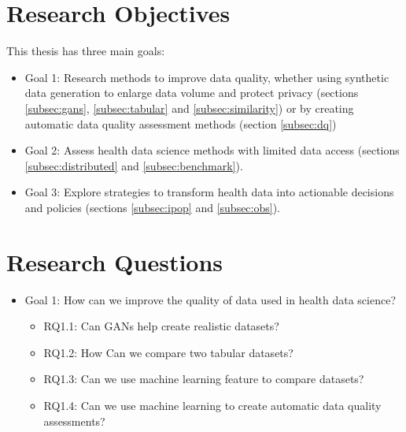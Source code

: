 
\section{Research Objectives}
This thesis has three main goals:


\begin{itemize}
    \item Goal 1: Research methods to improve data quality, whether using synthetic data generation to enlarge data volume and protect privacy (sections \ref{subsec:gans}, \ref{subsec:tabular} and \ref{subsec:similarity}) or by creating automatic data quality assessment methods (section \ref{subsec:dq})

    \item Goal 2: Assess health data science  methods with limited data access (sections \ref{subsec:distributed} and \ref{subsec:benchmark}).

    \item Goal 3: Explore strategies to transform health data into actionable decisions and policies (sections  \ref{subsec:ipop} and \ref{subsec:obs}).
\end{itemize}


\section{Research Questions}

\begin{itemize}
    \item Goal 1: How can we improve the quality of data used in health data science?
    \begin{itemize}
        \item RQ1.1: Can GANs help create realistic datasets?
        \item RQ1.2: How Can we compare two tabular datasets?
        \item RQ1.3: Can we use machine learning feature to compare datasets?
        \item RQ1.4: Can we use machine learning to create automatic data quality assessments?
    \end{itemize}
\end{itemize}

